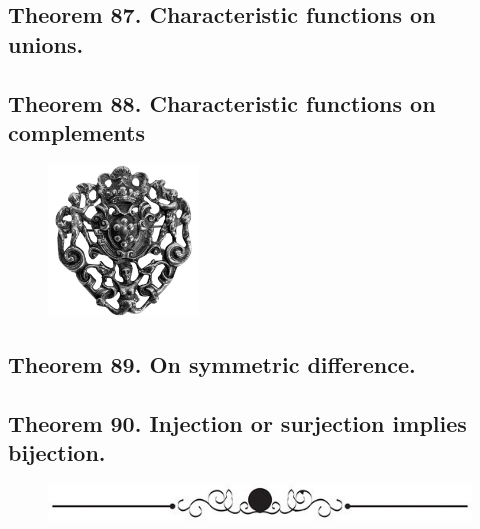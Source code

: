 \documentclass[preview]{standalone}
\begin{document}
\subsection[Characteristic functions on unions.]
    {
        \color{section}Theorem 87. \color{black} Characteristic functions on unions.
    }

\pagebreak


\subsection[Characteristic functions on a complement.]
    {
        \color{section}Theorem 88. \color{black} Characteristic functions on complements
    }

\begin{figure}[!h]
    \centering
    \includegraphics[width=4cm]{../resources/jpg/2.3.functions/symbol5.png}
\end{figure}
\pagebreak


\subsection[Characteristic functions on symmetric difference.]
    {
        \color{section}Theorem 89. \color{black} On symmetric difference.
    }



\subsection[With equal cardinality, injection or surjection implies bijection.]
    {
        \color{section}Theorem 90. \color{black} Injection or surjection implies bijection.
    }

\vspace{2.5\baselineskip}
\begin{figure}[!h]
    \centering
    \includegraphics[width=12cm]{../resources/jpg/2.3.functions/border3.jpg}
\end{figure}
\vspace{2\baselineskip}
\end{document}
